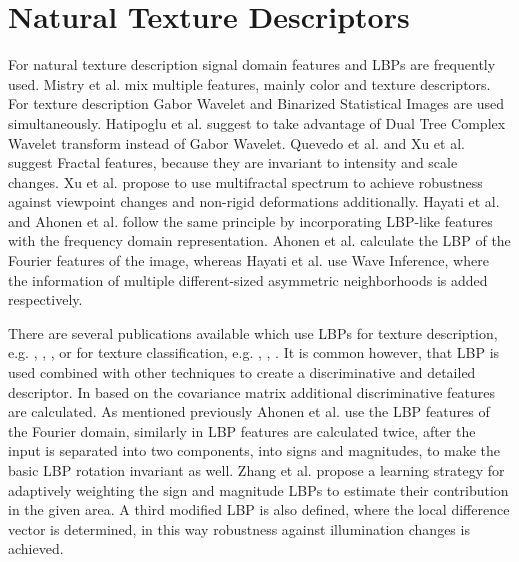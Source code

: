 \documentclass[draft,final]{vutinfth} %
\begin{document}
\section*{Natural Texture Descriptors}
\par
For natural texture description signal domain features and LBPs are frequently used.
Mistry et al. \cite{mistry2017content} mix multiple features, mainly color and texture descriptors.
For texture description Gabor Wavelet and Binarized Statistical Images  \cite{kannala2012bsif} are used simultaneously.
Hatipoglu et al. \cite{hatipoglu2000image} suggest to take advantage of Dual Tree Complex Wavelet transform instead of Gabor Wavelet.
Quevedo et al. \cite{quevedo2002description} and Xu et al. \cite{xu2009viewpoint} suggest Fractal features, because they are invariant to intensity and scale changes.
Xu et al. \cite{xu2009viewpoint} propose to use multifractal spectrum to achieve robustness against viewpoint changes and non-rigid deformations additionally.
Hayati et al. \cite{hayati2018wirif} and Ahonen et al. \cite{ahonen2009rotation} follow the same principle by incorporating LBP-like features with the frequency domain representation.
Ahonen et al. \cite{ahonen2009rotation} calculate the LBP of the Fourier features of the image, whereas Hayati et al. \cite{hayati2018wirif} use Wave Inference, where the information of multiple different-sized asymmetric neighborhoods is added respectively. 
\par
There are several publications available which use LBPs for texture description, e.g. \cite{guo2012discriminative}, \cite{hong2014combining}, \cite{ahonen2009rotation}, or for texture classification, e.g. \cite{khellah2011texture}, \cite{guo2010rotation}, \cite{zhang2017learning}.
It is common however, that LBP is used combined with other techniques to create a discriminative and detailed descriptor.
In \cite{hong2014combining} based on the covariance matrix additional discriminative features are calculated. 
As mentioned previously Ahonen et al. \cite{ahonen2009rotation} use the LBP features of the Fourier domain, similarly in \cite{guo2010completed} LBP features are calculated twice, after the input is separated into two components, into signs and magnitudes, to make the basic LBP rotation invariant as well.
Zhang et al.  \cite{zhang2017learning} propose a learning strategy for adaptively weighting the sign and magnitude LBPs to estimate their contribution in the given area. 
A third modified LBP is also defined, where the local difference vector is determined, in this way robustness against illumination changes is achieved.
\end{document}
